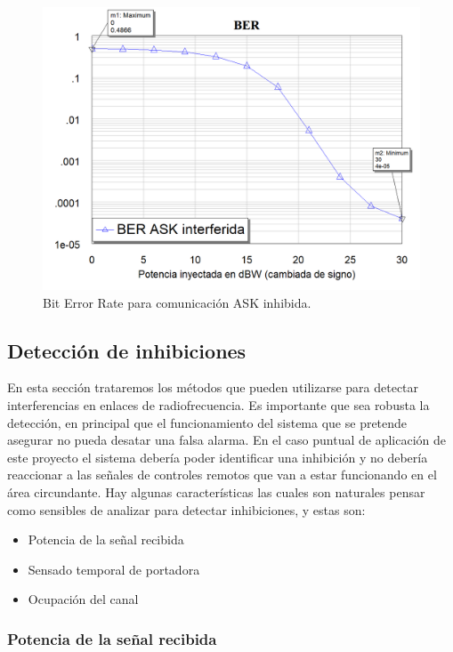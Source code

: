 \documentclass[12pt]{report}
\begin{document}
\begin{figure}[htb]
	\centering
	\includegraphics[scale=0.37]{BER_ask.png}
    \caption{Bit Error Rate para comunicación ASK inhibida.}
	\label{BER_ask}
\end{figure}

\subsection{Detección de inhibiciones}

En esta sección trataremos los métodos que pueden utilizarse para detectar interferencias en enlaces de radiofrecuencia. Es importante que 
sea robusta la detección, en principal que el funcionamiento del sistema que se pretende asegurar no pueda desatar una falsa alarma. En el caso
puntual de aplicación de este proyecto el sistema debería poder identificar una inhibición y no debería reaccionar a las señales de controles 
remotos que van a estar funcionando en el área circundante. 
Hay algunas características las cuales son naturales pensar como sensibles de analizar para detectar inhibiciones, y estas son: 

\begin{itemize}
    \item Potencia de la señal recibida
    \item Sensado temporal de portadora
    \item Ocupación del canal

\end{itemize}

\subsubsection{Potencia de la señal recibida}
\end{document}
